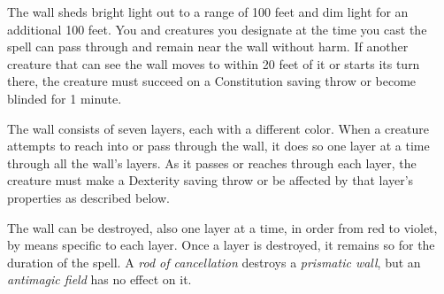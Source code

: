 The wall sheds bright light out to a range of 100 feet and dim light for an additional 100 feet. You and creatures you designate at the time you cast the spell can pass through and remain near the wall without harm. If another creature that can see the wall moves to within 20 feet of it or starts its turn there, the creature must succeed on a Constitution saving throw or become blinded for 1 minute.

The wall consists of seven layers, each with a different color. When a creature attempts to reach into or pass through the wall, it does so one layer at a time through all the wall’s layers. As it passes or reaches through each layer, the creature must make a Dexterity saving throw or be affected by that layer’s properties as described below.

The wall can be destroyed, also one layer at a time, in order from red to violet, by means specific to each layer. Once a layer is destroyed, it remains so for the duration of the spell. A \textit{rod of cancellation} destroys a \textit{prismatic wall}, but an \textit{antimagic field} has no effect on it.

